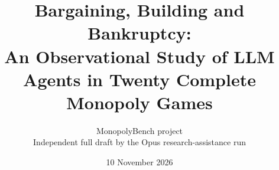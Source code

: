 \documentclass[11pt,letterpaper]{article}
\title{Bargaining, Building and Bankruptcy:\\ An Observational Study of LLM Agents in Twenty Complete Monopoly Games}
\author{MonopolyBench project\\{\small Independent full draft by the Opus research-assistance run}}
\date{10 November 2026}
\begin{document}


\maketitle
\begin{abstract}

\end{abstract}












\begingroup
\small


\endgroup
\clearpage
\appendix








\end{document}
